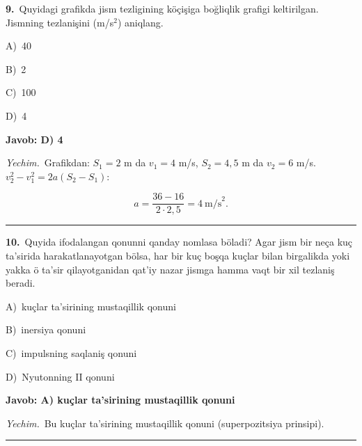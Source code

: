 \documentclass[11pt,a4paper]{article}
\newcommand{\opt}[2]{\hspace*{4mm}#1)\ #2\par}
\begin{document}
\noindent\begin{minipage}{\linewidth}
\textbf{9.}\ Quyidagi grafikda jism tezligining köçişiga boğliqlik grafigi keltirilgan. Jismning tezlanişini (m/s$^{2}$) aniqlang.\par\smallskip
\noindent\hspace*{4mm}\par\smallskip
\opt{A}{40}
\opt{B}{2}
\opt{C}{100}
\opt{D}{4}
\end{minipage}\vspace{2pt}\par
\noindent\colorbox{gray!12}{\parbox{\dimexpr\linewidth-2\fboxsep}{\textbf{Javob: D) 4}}}\par\smallskip
\noindent\textit{Yechim.}\ Grafikdan: $S_1=2$ m da $v_1=4$ m/s, $S_2=4{,}5$ m da $v_2=6$ m/s. $v_2^2-v_1^2=2a(S_2-S_1)$:\par
\[a=\frac{36-16}{2\cdot2{,}5}=4\ \text{m/s}^2.\]\par\medskip\hrule\medskip
{}\noindent\begin{minipage}{\linewidth}
\textbf{10.}\ Quyida ifodalangan qonunni qanday nomlasa böladi? Agar jism bir neça kuç ta’sirida harakatlanayotgan bölsa, har bir kuç boşqa kuçlar bilan birgalikda yoki yakka ö ta’sir qilayotganidan qat’iy nazar jismga hamma vaqt bir xil tezlaniş beradi.\par\smallskip
\opt{A}{kuçlar ta’sirining mustaqillik qonuni}
\opt{B}{inersiya qonuni}
\opt{C}{impulsning saqlaniş qonuni}
\opt{D}{Nyutonning II qonuni}
\end{minipage}\vspace{2pt}\par
\noindent\colorbox{gray!12}{\parbox{\dimexpr\linewidth-2\fboxsep}{\textbf{Javob: A) kuçlar ta’sirining mustaqillik qonuni}}}\par\smallskip
\noindent\textit{Yechim.}\ Bu kuçlar ta’sirining mustaqillik qonuni (superpozitsiya prinsipi).\par\par\medskip\hrule\medskip
\end{document}
